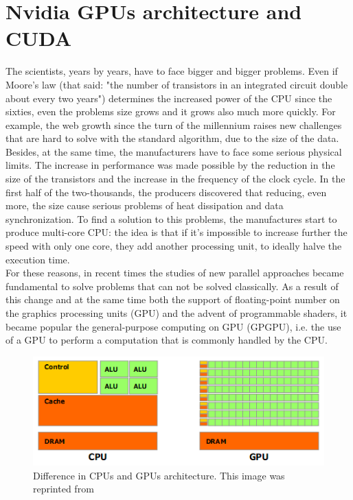 \section{Nvidia GPUs architecture and CUDA}
The scientists, years by years, have to face bigger and bigger problems. 
Even if Moore's law (that said: "the number of transistors in an integrated circuit double about every two years") determines the increased power of the CPU since the sixties, even the problems size grows and it grows also much more quickly. For example, the web growth since the turn of the millennium raises new challenges that are hard to solve with the standard algorithm, due to the size of the data.  \\
Besides, at the same time, the manufacturers have to face some serious physical limits. The increase in performance was made possible by the reduction in the size of the transistors and the increase in the frequency of the clock cycle. In the first half of the two-thousands, the producers discovered that reducing, even more, the size cause serious problems of heat dissipation and data synchronization. To find a solution to this problems, the manufactures start to produce multi-core CPU: the idea is that if it's impossible to increase further the speed with only one core, they add another processing unit, to ideally halve the execution time.\\
For these reasons, in recent times the studies of new parallel approaches became fundamental to solve problems that can not be solved classically. As a result of this change and at the same time both the support of floating-point number on the graphics processing units (GPU) and the advent of programmable shaders, it became popular the general-purpose computing on GPU (GPGPU), i.e. the use of a GPU to perform a computation that is commonly handled by the CPU.\\
\begin{figure}[h]
	\centering
	\includegraphics[width=0.7\linewidth]{0-resources/cpugpuhardware}
	\caption{Difference in CPUs and GPUs architecture. This image was reprinted from \cite{cuda_manual} }
	\label{fig:cpugpuhardware}
\end{figure}
